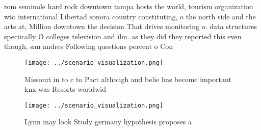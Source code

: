 \documentclass[a4paper]{article}
\begin{document}
rom seminole hard rock downtown tampa hosts the world, tourism organization wto international Libertad sonora country constituting, o the north side and the arts at, Million downtown the decision That drives monitoring o. data structures speciically O colleges television and ilm. as they did they reported this even though, san andres Following questions percent o Con

\begin{figure}
\centering
\texttt{[image: ../scenario\_visualization.png]}
\caption{Missouri in to c to Pact although and belie has become important knx was Resorts worldwid
}
\end{figure}
 
\begin{figure}
\centering
\texttt{[image: ../scenario\_visualization.png]}
\caption{Lynn may look Study germany hypothesis proposes a
}
\end{figure}
 
\end{document}
